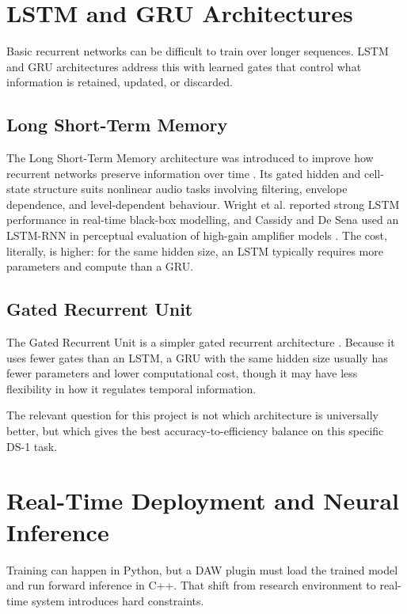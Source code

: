 \section{LSTM and GRU Architectures}

Basic recurrent networks can be difficult to train over longer sequences. LSTM and GRU architectures address this with learned gates that control what information is retained, updated, or discarded.

\subsection{Long Short-Term Memory}

The Long Short-Term Memory architecture was introduced to improve how recurrent networks preserve information over time \cite{hochreiter_long_1997}. Its gated hidden and cell-state structure suits nonlinear audio tasks involving filtering, envelope dependence, and level-dependent behaviour. Wright et al. reported strong LSTM performance in real-time black-box modelling, and Cassidy and De Sena used an LSTM-RNN in perceptual evaluation of high-gain amplifier models \cite{wright_real-time_2019,cassidy_perceptual_2023}. The cost, literally, is higher: for the same hidden size, an LSTM typically requires more parameters and compute than a GRU.

\subsection{Gated Recurrent Unit}

The Gated Recurrent Unit is a simpler gated recurrent architecture \cite{cho_learning_2014}. Because it uses fewer gates than an LSTM, a GRU with the same hidden size usually has fewer parameters and lower computational cost, though it may have less flexibility in how it regulates temporal information.

The relevant question for this project is not which architecture is universally better, but which gives the best accuracy-to-efficiency balance on this specific DS-1 task.

\section{Real-Time Deployment and Neural Inference}

Training can happen in Python, but a DAW plugin must load the trained model and run forward inference in C++. That shift from research environment to real-time system introduces hard constraints.

